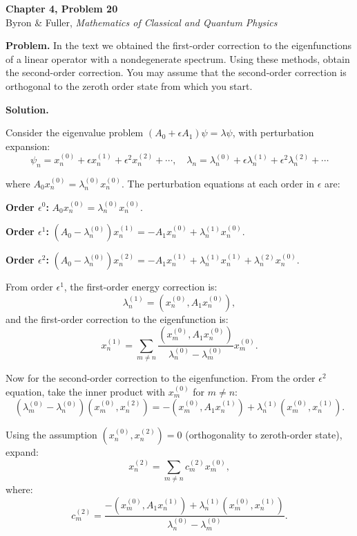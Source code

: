 \documentclass[12pt]{article}
\begin{document}
\begin{center}
{\Large\bfseries Chapter 4, Problem 20}\\[6pt]
Byron \& Fuller, \textit{Mathematics of Classical and Quantum Physics}
\end{center}

\bigskip

\textbf{Problem.} In the text we obtained the first-order correction to the eigenfunctions of a linear operator with a nondegenerate spectrum. Using these methods, obtain the second-order correction. You may assume that the second-order correction is orthogonal to the zeroth order state from which you start.

\bigskip
\textbf{Solution.}

Consider the eigenvalue problem $(A_0 + \epsilon A_1)\psi = \lambda\psi$, with perturbation expansion:
\[
\psi_n = x_n^{(0)} + \epsilon x_n^{(1)} + \epsilon^2 x_n^{(2)} + \cdots, \quad \lambda_n = \lambda_n^{(0)} + \epsilon\lambda_n^{(1)} + \epsilon^2\lambda_n^{(2)} + \cdots
\]

where $A_0 x_n^{(0)} = \lambda_n^{(0)} x_n^{(0)}$. The perturbation equations at each order in $\epsilon$ are:

\textbf{Order $\epsilon^0$:} $A_0 x_n^{(0)} = \lambda_n^{(0)} x_n^{(0)}$.

\textbf{Order $\epsilon^1$:} $(A_0 - \lambda_n^{(0)})x_n^{(1)} = -A_1 x_n^{(0)} + \lambda_n^{(1)} x_n^{(0)}$.

\textbf{Order $\epsilon^2$:} $(A_0 - \lambda_n^{(0)})x_n^{(2)} = -A_1 x_n^{(1)} + \lambda_n^{(1)} x_n^{(1)} + \lambda_n^{(2)} x_n^{(0)}$.

From order $\epsilon^1$, the first-order energy correction is:
\[
\lambda_n^{(1)} = (x_n^{(0)}, A_1 x_n^{(0)}),
\]
and the first-order correction to the eigenfunction is:
\[
x_n^{(1)} = \sum_{m \neq n} \frac{(x_m^{(0)}, A_1 x_n^{(0)})}{\lambda_n^{(0)} - \lambda_m^{(0)}} x_m^{(0)}.
\]

Now for the second-order correction to the eigenfunction. From the order $\epsilon^2$ equation, take the inner product with $x_m^{(0)}$ for $m \neq n$:
\[
(\lambda_m^{(0)} - \lambda_n^{(0)})(x_m^{(0)}, x_n^{(2)}) = -(x_m^{(0)}, A_1 x_n^{(1)}) + \lambda_n^{(1)}(x_m^{(0)}, x_n^{(1)}).
\]

Using the assumption $(x_n^{(0)}, x_n^{(2)}) = 0$ (orthogonality to zeroth-order state), expand:
\[
x_n^{(2)} = \sum_{m \neq n} c_m^{(2)} x_m^{(0)},
\]
where:
\[
c_m^{(2)} = \frac{-(x_m^{(0)}, A_1 x_n^{(1)}) + \lambda_n^{(1)}(x_m^{(0)}, x_n^{(1)})}{\lambda_n^{(0)} - \lambda_m^{(0)}}.
\]
\end{document}
